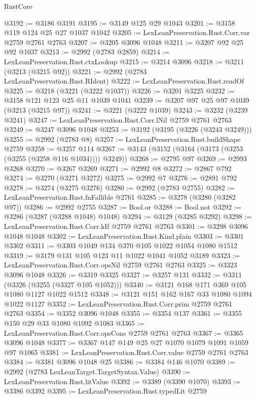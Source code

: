 \begin{lexlean}{RustCore}
\begin{coremodule}
@3192 := @3186 @3191
@3195 := @3149 @125 @29 @1043
@3201 := @3158 @119 @124 @25 @27 @1037 @1042
@3205 := LexLeanPreservation.Rust.Corr.var @2759 @2761 @2763
@3207 := @3205 @3096 @1048
@3211 := @3207 @92 @25 @92 @1037
@3213 := @2992 (@2783 @2859)
@3214 := LexLeanPreservation.Rust.ctxLookup
@3215 := @3214 @3096
@3218 := @3211 (@3213 (@3215 @92))
@3221 := @2992 (@2783 LexLeanPreservation.Rust.RIdent)
@3222 := LexLeanPreservation.Rust.readOf
@3225 := @3218 (@3221 (@3222 @1037))
@3226 := @3201 @3225
@3232 := @3158 @121 @123 @25 @11 @1039 @1041
@3239 := @3207 @97 @25 @97 @1039 (@3213 (@3215 @97))
@3241 := @3221 (@3222 @1039)
@3243 := @3232 (@3239 @3241)
@3247 := LexLeanPreservation.Rust.Corr.lNil @2759 @2761 @2763
@3249 := @3247 @3096 @1048
@3253 := @3192 (@3195 (@3226 (@3243 @3249)))
@3255 := @2992 (@2783 @8)
@3257 := LexLeanPreservation.Rust.buildShape @2759
@3258 := @3257 @114
@3267 := @3143 (@3152 (@3164 (@3173 (@3253 (@3255 (@3258 @116 @1034)))) @3249))
@3268 := @2795 @97
@3269 := @2993 @3268
@3270 := @3267 @3269
@3271 := @2992 @8
@3272 := @2867 @792
@3274 := @3270 (@3271 @3272)
@3275 := @2992 @7
@3276 := @2891 @792
@3278 := @3274 (@3275 @3276)
@3280 := @2992 (@2783 @2755)
@3282 := LexLeanPreservation.Rust.fnFallible @2761
@3285 := @3278 (@3280 (@3282 @97))
@3286 := @2992 @2755
@3287 := Bool.or
@3288 := Bool.not
@3292 := @3286 (@3287 (@3288 @1048) @1048)
@3294 := @3129 (@3285 @3292)
@3298 := LexLeanPreservation.Rust.Corr.kIf @2759 @2761 @2763
@3301 := @3298 @3096 @1048 @1048
@3302 := LexLeanPreservation.Rust.Kind.plain
@3303 := @3301 @3302
@3311 := @3303 @1049 @134 @370 @105 @1022 @1054 @1080 @1512
@3319 := @3179 @131 @105 @123 @11 @1022 @1041 @1052 @3189
@3323 := LexLeanPreservation.Rust.Corr.opsNil @2759 @2761 @2763
@3325 := @3323 @3096 @1048
@3326 := @3319 @3325
@3327 := @3257 @131
@3332 := @3311 (@3326 (@3255 (@3327 @105 @1052)))
@3340 := @3121 @168 @171 @369 @105 @1080 @1127 @1022 @1512
@3348 := @3121 @151 @162 @167 @33 @1080 @1094 @1022 @1127
@3352 := LexLeanPreservation.Rust.Corr.prim @2759 @2761 @2763
@3354 := @3352 @3096 @1048
@3355 := @3354 @137
@3361 := @3355 @150 @29 @33 @1080 @1092 @1083
@3365 := LexLeanPreservation.Rust.Corr.opsCons @2759 @2761 @2763
@3367 := @3365 @3096 @1048
@3377 := @3367 @147 @149 @25 @27 @1070 @1079 @1091 @1059 @97 @1065
@3381 := LexLeanPreservation.Rust.Corr.value @2759 @2761 @2763
@3384 := @3381 @3096 @1048 @25
@3386 := @3384 @146 @1070
@3389 := @2992 (@2783 LexLeanTarget.TargetSyntax.Value)
@3390 := LexLeanPreservation.Rust.litValue
@3392 := @3389 (@3390 @1070)
@3393 := @3386 @3392
@3395 := LexLeanPreservation.Rust.typedLit @2759

\end{coremodule}
\end{lexlean}
